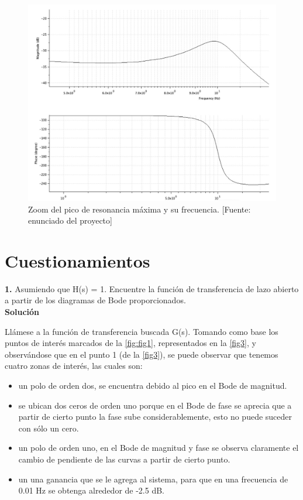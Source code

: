 \documentclass[12pt,letterpaper]{article}
\begin{document}
\begin{figure}[hbtp]
	\centering
	\includegraphics[width = \columnwidth]{Fig2.jpg} 
	\caption[Figura3]{Zoom del pico de resonancia máxima y su frecuencia. [Fuente: enunciado del proyecto]} 
	\label{fig:fig2} 
\end{figure}

\section{Cuestionamientos}


\textbf{1.} Asumiendo que H(s) = 1. Encuentre la función de transferencia de lazo abierto a partir de los diagramas de Bode proporcionados.\\

\textbf{Solución}

\bigskip

Llámese a la función de transferencia buscada G(s). Tomando como base los puntos de interés marcados de la \ref{fig:fig1}, representados en la \ref{fig3}, y observándose que en el punto 1 (de la  \ref{fig3}), se puede observar que tenemos cuatro zonas de interés, las cuales son: 

\begin{itemize}
    \item un polo de orden dos, se encuentra debido al pico en el Bode de magnitud.
    \item se ubican dos ceros de orden uno porque en el Bode de fase se aprecia que a partir de cierto punto la fase sube considerablemente, esto no puede suceder con sólo un cero.
    \item un polo de orden uno, en el Bode de magnitud y fase se observa claramente el cambio de pendiente de las curvas a partir de cierto punto.
    \item un una ganancia que se le agrega al sistema, para que en una frecuencia de 0.01 Hz se obtenga alrededor de -2.5 dB.
\end{itemize}
\end{document}

